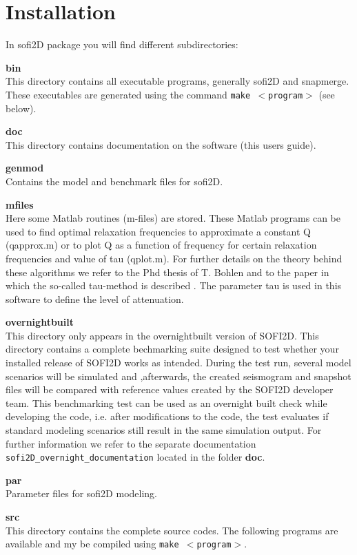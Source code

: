 \documentclass[11pt,onecolumn,oneside]{article}
\begin{document}
\section{Installation}
\label{installation}
In sofi2D package you will find different subdirectories:

\textbf{bin}\\
This directory contains all executable programs, generally sofi2D and snapmerge. These executables are generated using the command \texttt{make $<$program$>$} (see below).

\textbf{doc}\\
This directory contains documentation on the software (this users guide).

\textbf{genmod}\\
Contains the model and benchmark files for sofi2D.

\textbf{mfiles}\\
Here some Matlab routines (m-files) are stored. These Matlab programs can be used to find optimal relaxation frequencies to approximate a constant Q (qapprox.m) or to plot Q as a function of frequency for
certain relaxation frequencies and value of tau (qplot.m). For further details on the theory behind these algorithms we refer to the Phd thesis of T. Bohlen \cite{bohlen:98} and to the paper in which the so-called tau-method is described \cite{blanch:95}. The parameter tau is used in this software to define the level of attenuation.

\textbf{overnightbuilt}\\
This directory only appears in the overnightbuilt version of SOFI2D.
This directory contains a complete bechmarking suite designed to test whether your installed release of SOFI2D works as intended. During the test run, several model scenarios will be simulated and ,afterwards, the created seismogram and snapshot files will be compared with reference values created by the SOFI2D developer team. This benchmarking test can be used as an overnight built check while developing the code, i.e. after modifications to the code, the test evaluates if standard modeling scenarios still result in the same simulation output. For further information we refer to the separate documentation \texttt{sofi2D\_overnight\_documentation} located in the folder \textbf{doc}.

\textbf{par}\\
Parameter files for sofi2D modeling.

\textbf{src}\\
This directory contains the complete source codes.  The following programs are available and my be compiled using \texttt{make $<$program$>$}.
\end{document}
